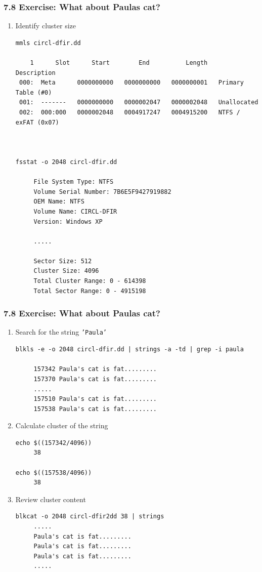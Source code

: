 \begin{frame}[fragile]
  \frametitle{7.8 Exercise: What about Paulas cat?}
    \begin{enumerate}
        \item Identify cluster size
        \begin{lstlisting}[basicstyle=\tiny]
mmls circl-dfir.dd

    1      Slot      Start        End          Length       Description
 000:  Meta      0000000000   0000000000   0000000001   Primary Table (#0)
 001:  -------   0000000000   0000002047   0000002048   Unallocated
 002:  000:000   0000002048   0004917247   0004915200   NTFS / exFAT (0x07)



fsstat -o 2048 circl-dfir.dd

     File System Type: NTFS
     Volume Serial Number: 7B6E5F9427919882
     OEM Name: NTFS    
     Volume Name: CIRCL-DFIR
     Version: Windows XP

     .....

     Sector Size: 512
     Cluster Size: 4096
     Total Cluster Range: 0 - 614398
     Total Sector Range: 0 - 4915198
        \end{lstlisting}
    \seti
    \end{enumerate}
\end{frame}


\begin{frame}[fragile]
  \frametitle{7.8 Exercise: What about Paulas cat?}
    \begin{enumerate}
        \conti
        \item Search for the string \texttt{'Paula'}
        \begin{lstlisting}[basicstyle=\tiny]
blkls -e -o 2048 circl-dfir.dd | strings -a -td | grep -i paula

     157342 Paula's cat is fat.........
     157370 Paula's cat is fat.........
     .....
     157510 Paula's cat is fat.........
     157538 Paula's cat is fat.........
        \end{lstlisting}

        \item Calculate cluster of the string
        \begin{lstlisting}[basicstyle=\tiny]
echo $((157342/4096))
     38

echo $((157538/4096))
     38
        \end{lstlisting}

        \item Review cluster content
        \begin{lstlisting}[basicstyle=\tiny]
blkcat -o 2048 circl-dfir2dd 38 | strings
     .....
     Paula's cat is fat.........
     Paula's cat is fat.........
     Paula's cat is fat.........
     .....
        \end{lstlisting}
    \seti
    \end{enumerate}
\end{frame}


